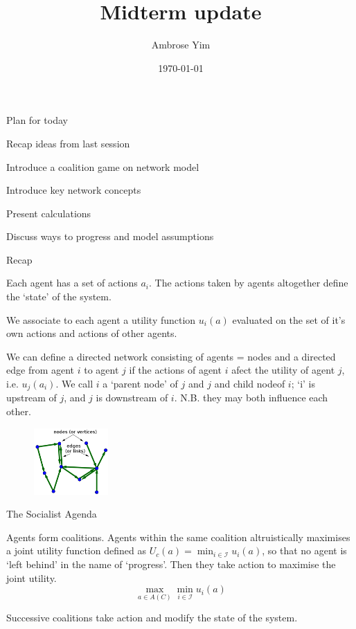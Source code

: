 \documentclass[10pt]{beamer}
\title{Midterm update}
\date{\today}
\author{Ambrose Yim}
\begin{document}
\maketitle

\begin{frame}{Plan for today}

Recap ideas from last session

Introduce a coalition game on network model

Introduce key network concepts

Present calculations

Discuss ways to progress and model assumptions


\end{frame}


\begin{frame}[fragile]{Recap}

Each agent has a set of actions $a_i$. The actions taken by agents altogether define the `state' of the system.

We associate to each agent a utility function $u_i(a)$ evaluated on the set of it's own actions and actions of other agents.

We can define a directed network consisting of agents = nodes and a directed edge from agent $i$ to agent $j$ if the actions of agent $i$ afect the utility of agent $j$, i.e. $u_j(a_i)$. We call $i$ a `parent node' of $j$ and $j$ and child nodeof $i$; `i' is upstream of $j$, and $j$ is downstream of $i$. N.B. they may both influence each other.
\begin{figure}[b]
\centering
\includegraphics[height=1in]{directed_network}
\end{figure}
\end{frame}

\begin{frame}{The Socialist Agenda}

Agents form coalitions. Agents within the same coalition altruistically maximises a joint utility function defined as  $U_c(a) = \min_{i \in \mathcal{I}} u_i(a)$, so that no agent is `left behind' in the name of `progress'. Then they take action to maximise the joint utility.
$$ \max_{a \in A(C)} \min_{i \in \mathcal{I}} u_i(a) $$

Successive coalitions take action and modify the state of the system.

\end{frame}
\end{document}
